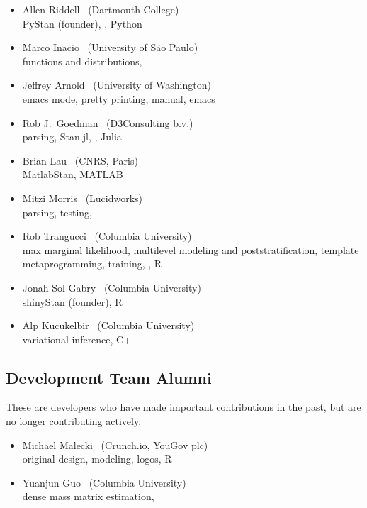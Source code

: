 \begin{itemize}
\item Allen Riddell \   (Dartmouth College)
\\ {\footnotesize PyStan (founder), \Cpp, Python}
\item Marco Inacio \   (University of S\~{a}o Paulo)
\\ {\footnotesize functions and distributions, \Cpp}
\item Jeffrey Arnold \   (University of Washington)
\\ {\footnotesize emacs mode, pretty printing, manual, emacs}
\item Rob J.\ Goedman \ (D3Consulting b.v.)
\\ {\footnotesize parsing, Stan.jl, \Cpp, Julia}
\item Brian Lau \ (CNRS, Paris)
\\ {\footnotesize MatlabStan, MATLAB}
\item Mitzi Morris \   (Lucidworks)
\\ {\footnotesize parsing, testing, \Cpp}
\item Rob Trangucci \   (Columbia University)
\\ {\footnotesize max marginal likelihood, multilevel modeling and
  poststratification, template metaprogramming, training, \Cpp, R}
\item Jonah Sol Gabry \ (Columbia University)
\\ {\footnotesize shinyStan (founder), R}
\item Alp Kucukelbir \ (Columbia University)
\\ {\footnotesize variational inference, C++}
\end{itemize}

\subsection*{Development Team Alumni}

These are developers who have made important contributions in the
past, but are no longer contributing actively.

\begin{itemize}
\item Michael Malecki \ (Crunch.io, YouGov plc)
\\ {\footnotesize original design, modeling, logos, R}
\item Yuanjun Guo \ (Columbia University)
\\ {\footnotesize dense mass matrix estimation, \Cpp}
\end{itemize}

